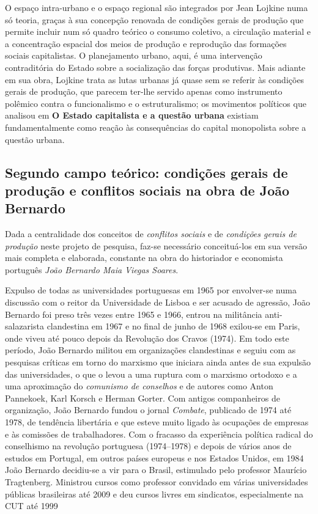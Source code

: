 O espaço intra-urbano e o espaço regional são integrados por Jean Lojkine numa só teoria, graças à sua concepção renovada de condições gerais de produção que permite incluir num só quadro teórico o consumo coletivo, a circulação material e a concentração espacial dos meios de produção e reprodução das formações sociais capitalistas. O planejamento urbano, aqui, é uma intervenção contraditória do Estado sobre a socialização das forças produtivas. Mais adiante em sua obra, Lojkine trata as lutas urbanas já quase sem se referir às condições gerais de produção, que parecem ter-lhe servido apenas como instrumento polêmico contra o funcionalismo e o estruturalismo; os movimentos políticos que analisou em \textbf{O Estado capitalista e a questão urbana} existiam fundamentalmente como reação às consequências do capital monopolista sobre a questão urbana.

\subsection{Segundo campo teórico: condições gerais de produção e conflitos sociais na obra de João Bernardo}
\label{subsec:cgpcsjobe}

Dada a centralidade dos conceitos de \textit{conflitos sociais} e de \textit{condições gerais de produção} neste projeto de pesquisa, faz-se necessário conceituá-los em sua versão mais completa e elaborada, constante na obra do historiador e economista português \textit{João Bernardo Maia Viegas Soares}. 

Expulso de todas as universidades portuguesas em 1965 por envolver-se numa discussão com o reitor da Universidade de Lisboa e ser acusado de agressão, João Bernardo foi preso três vezes entre 1965 e 1966, entrou na militância anti-salazarista clandestina em 1967 e no final de junho de 1968 exilou-se em Paris, onde viveu até pouco depois da Revolução dos Cravos (1974). Em todo este período, João Bernardo militou em organizações clandestinas e seguiu com as pesquisas críticas em torno do marxismo que iniciara ainda antes de sua expulsão das universidades, o que o levou a uma ruptura com o marxismo ortodoxo e a uma aproximação do \textit{comunismo de conselhos} e de autores como Anton Pannekoek, Karl Korsch e Herman Gorter. Com antigos companheiros de organização, João Bernardo fundou o jornal \textit{Combate}, publicado de 1974 até 1978, de tendência libertária e que esteve muito ligado às ocupações de empresas e às comissões de trabalhadores. Com o fracasso da experiência política radical do conselhismo na revolução portuguesa (1974–1978) e depois de vários anos de estudos em Portugal, em outros países europeus e nos Estados Unidos, em 1984 João Bernardo decidiu-se a vir para o Brasil, estimulado pelo professor Maurício Tragtenberg. Ministrou cursos como professor convidado em várias universidades públicas brasileiras até 2009 e deu cursos livres em sindicatos, especialmente na CUT até 1999 \cite{BERNARDO2014} 

